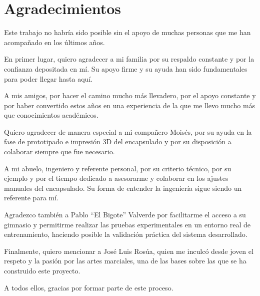 \section*{Agradecimientos}
\vspace{2cm}


Este trabajo no habría sido posible sin el apoyo de muchas personas que me han acompañado en los últimos años.

En primer lugar, quiero agradecer a mi familia por su respaldo constante y por la confianza depositada en mí. Su apoyo firme y su ayuda han sido fundamentales para poder llegar hasta aquí.

A mis amigos, por hacer el camino mucho más llevadero, por el apoyo constante y por haber convertido estos años en una experiencia de la que me llevo mucho más que conocimientos académicos.

Quiero agradecer de manera especial a mi compañero Moisés, por su ayuda en la fase de prototipado e impresión 3D del encapsulado y por su disposición a colaborar siempre que fue necesario.

A mi abuelo, ingeniero y referente personal, por su criterio técnico, por su ejemplo y por el tiempo dedicado a asesorarme y colaborar en los ajustes manuales del encapsulado. Su forma de entender la ingeniería sigue siendo un referente para mí.

Agradezco también a Pablo “El Bigote” Valverde por facilitarme el acceso a su gimnasio y permitirme realizar las pruebas experimentales en un entorno real de entrenamiento, haciendo posible la validación práctica del sistema desarrollado.

Finalmente, quiero mencionar a José Luis Rosúa, quien me inculcó desde joven el respeto y la pasión por las artes marciales, una de las bases sobre las que se ha construido este proyecto.

A todos ellos, gracias por formar parte de este proceso.



